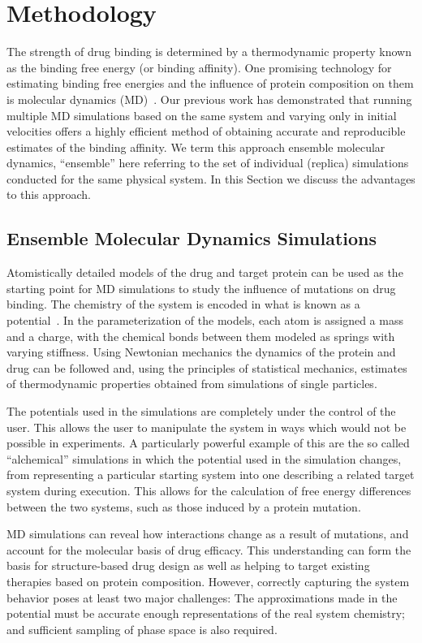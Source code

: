 \documentclass[conference]{IEEEtran}
\begin{document}
\section{Methodology}\label{sec:meth}
%
The strength of drug binding is determined by a thermodynamic property known
as the binding free energy (or binding affinity). One promising technology for
estimating binding free energies and the influence of protein composition on
them is molecular dynamics (MD)~\cite{Karplus2005}. Our previous work
\cite{Sadiq2010, Wan2011} has demonstrated that running multiple MD
simulations based on the same system and varying only in initial velocities
offers a highly efficient method of obtaining accurate and reproducible
estimates of the binding affinity. We term this approach ensemble molecular
dynamics, ``ensemble'' here referring to the set of individual (replica)
simulations conducted for the same physical system. In this Section we discuss
the advantages to this approach.

%
\subsection{Ensemble Molecular Dynamics Simulations}

Atomistically detailed models of the drug and target protein can be used as the
starting point for MD simulations to
study the influence of mutations on drug binding. The chemistry of the system
is encoded in what is known as a potential~\cite{Karplus2002}. In the
parameterization of the models, each atom is assigned a mass and a charge,
with the chemical bonds between them modeled as springs with varying
stiffness. Using Newtonian mechanics the dynamics of the protein and drug can
be followed and, using the principles of statistical mechanics, estimates of
thermodynamic properties obtained from simulations of single particles.

The potentials used in the simulations are completely under the control of
the user. This allows the user to manipulate the system in ways which would
not be possible in experiments. A particularly powerful example of this are
the so called ``alchemical'' simulations in which the potential used in the
simulation changes, from representing a particular starting system into one 
describing a related target system during execution. This allows for the 
calculation of free energy differences between the two systems, such as those 
induced by a protein mutation.

MD simulations can reveal how interactions change as a result of mutations,
and account for the molecular basis of drug efficacy. This understanding can
form the basis for structure-based drug design as well as helping to target
existing therapies based on protein composition. However, correctly capturing
the system behavior poses at least two major challenges: The approximations
made in the potential must be accurate enough representations of the real
system chemistry; and sufficient sampling of phase space is also required.
\end{document}
